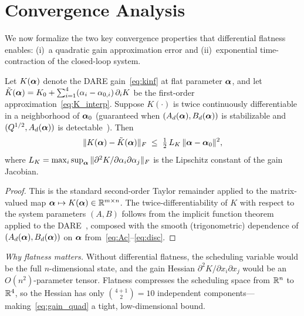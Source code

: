 \section{Convergence Analysis}\label{sec:convergence}

We now formalize the two key convergence properties that
differential flatness enables: (i)~a quadratic gain
approximation error and (ii)~exponential time-contraction
of the closed-loop system.

\begin{proposition}\label{prop:gain_approx}
Let $K(\bm{\alpha})$ denote the DARE gain~\eqref{eq:kinf} at
flat parameter $\bm{\alpha}$, and let
$\tilde{K}(\bm{\alpha}) = K_0 + \sum_{i=1}^{4}
(\alpha_i - \alpha_{0,i}) \, \partial_i K$
be the first-order approximation~\eqref{eq:K_interp}.
Suppose $K(\cdot)$ is twice continuously differentiable
in a neighborhood of $\bm{\alpha}_0$
(guaranteed when $(A_d(\bm{\alpha}), B_d(\bm{\alpha}))$ is
stabilizable and $(Q^{1/2}, A_d(\bm{\alpha}))$ is
detectable~\cite{konstantinov1993}).
Then
\begin{equation}\label{eq:gain_quad}
  \|K(\bm{\alpha}) - \tilde{K}(\bm{\alpha})\|_F
  \;\leq\; \tfrac{1}{2} \, L_K \, \|\bm{\alpha} - \bm{\alpha}_0\|^2,
\end{equation}
where $L_K = \max_i \sup_{\bm{\alpha}} \|\partial^2 K / \partial \alpha_i \partial \alpha_j\|_F$
is the Lipschitz constant of the gain Jacobian.
\end{proposition}

\begin{proof}
This is the standard second-order Taylor remainder applied
to the matrix-valued map $\bm{\alpha} \mapsto K(\bm{\alpha}) \in \mathbb{R}^{m \times n}$.
The twice-differentiability of $K$ with respect to
the system parameters $(A, B)$ follows from the implicit
function theorem applied to the DARE~\cite{hewer1971,konstantinov1993},
composed with the smooth (trigonometric) dependence of
$(A_d(\bm{\alpha}), B_d(\bm{\alpha}))$ on $\bm{\alpha}$
from~\eqref{eq:Ac}--\eqref{eq:disc}.
\end{proof}

\textit{Why flatness matters.}
Without differential flatness, the scheduling variable
would be the full $n$-dimensional state, and the gain
Hessian $\partial^2 K / \partial x_i \partial x_j$ would
be an $O(n^2)$-parameter tensor.
Flatness compresses the scheduling space from $\mathbb{R}^n$ to
$\mathbb{R}^4$, so the Hessian has only $\binom{4+1}{2} = 10$
independent components---making~\eqref{eq:gain_quad}
a tight, low-dimensional bound.

